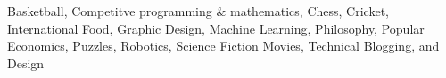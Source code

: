 
{%
	Basketball, Competitve programming \& mathematics, Chess, Cricket, International Food, Graphic Design, Machine Learning, Philosophy, Popular Economics, Puzzles, Robotics, Science Fiction Movies, Technical Blogging, and  Design
}